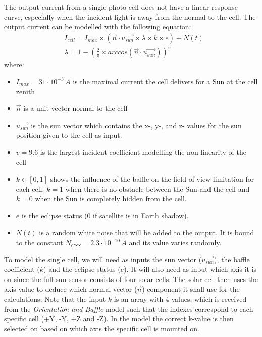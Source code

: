 The output current from a single photo-cell does not have a linear response curve, especially when the incident light is away from the normal to the cell. 
The output current can be modelled with the following equation:
\begin{equation}
    \begin{split}
        &I_{cell} = I_{max} \times (\Vec{n} \cdot \Vec{u_{sun}} \times \lambda \times k \times e) + N(t) \\
        &\lambda = 1 - \left( \frac{2}{\pi} \times arccos(\Vec{n} \cdot \Vec{u_{sun}})\right)^v
    \end{split}
\end{equation}
where:
\begin{itemize}
    \item $I_{max}=31 \cdot 10^{-3} \, A$ is the maximal current the cell delivers for a Sun at the cell zenith
    \item $\Vec{n}$ is a unit vector normal to the cell
    \item $\Vec{u_{sun}}$ is the sun vector which contains the x-, y-, and z- values for the sun position given to the cell as input.
    \item $v = 9.6$ is the largest incident coefficient modelling the non-linearity of the cell
    \item $k \in [0,1]$ shows the influence of the baffle on the field-of-view limitation for each cell. $k=1$ when there is no obstacle between the Sun and the cell and $k=0$ when the Sun is completely hidden from the cell.
    \item $e$ is the eclipse status (0 if satellite is in Earth shadow). 
    \item $N(t)$ is a random white noise that will be added to the output. It is bound to the constant $N_{CSS} = 2.3 \cdot 10^{-10}\, A$ and its value varies randomly.
\end{itemize}

To model the single cell, we will need as inputs the sun vector ($\Vec{u_{sun}}$), the baffle coefficient ($k$) and the eclipse status ($e$).
It will also need as input which axis it is on since the full sun sensor consists of four solar cells. 
The solar cell then uses the axis value to deduce which normal vector ($\Vec{n}$) component it shall use for the calculations.
Note that the input $k$ is an array with 4 values, which is received from the \textit{Orientation and Baffle} model such that the indexes correspond to each specific cell (+Y, -Y, +Z and -Z).
In the model the correct k-value is then selected on based on which axis the specific cell is mounted on.

